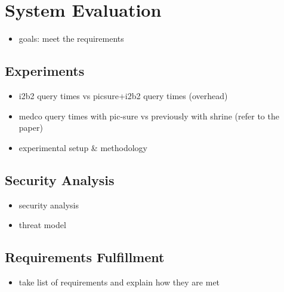 \chapter{System Evaluation}


\begin{itemize}
    \item goals: meet the requirements
\end{itemize}

\section{Experiments}


\begin{itemize}
    \item i2b2 query times vs picsure+i2b2 query times (overhead)
    \item medco query times with pic-sure vs previously with shrine (refer to the paper)
    \item experimental setup & methodology
\end{itemize}

\section{Security Analysis}
\begin{itemize}
    \item security analysis
    \item threat model
\end{itemize}






\section{Requirements Fulfillment}
\begin{itemize}
    \item take list of requirements and explain how they are met
\end{itemize}


